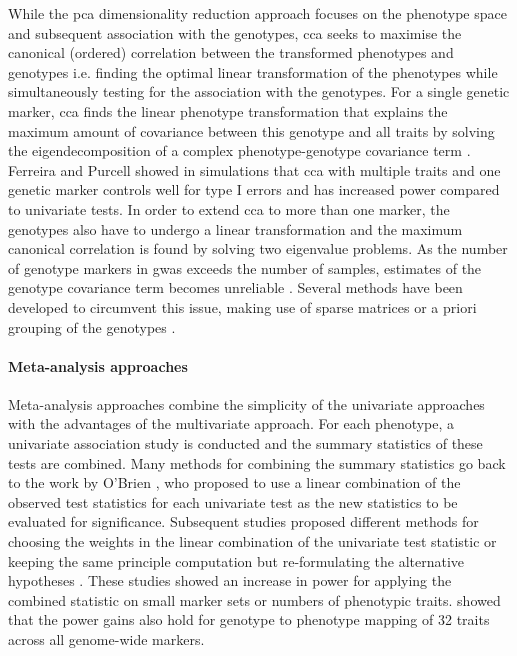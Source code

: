 While the \gls{pca}  dimensionality reduction approach focuses on the phenotype space and subsequent association with the genotypes, \gls{cca}   seeks to maximise the canonical (ordered) correlation between the transformed phenotypes and genotypes i.e. finding the optimal linear transformation of the phenotypes while simultaneously testing for the association with the genotypes.  For a single genetic marker, \gls{cca}  finds the linear phenotype transformation that explains the maximum amount of covariance between this genotype and all traits by solving the eigendecomposition of a complex phenotype-genotype covariance term \citep{Yang2012b}. Ferreira and Purcell \parencite*{Ferreira2009} showed in simulations that \gls{cca}  with multiple traits and one genetic marker controls well for type I errors and has increased power compared to univariate tests. In order to extend \gls{cca}  to more than one marker, the genotypes also have to undergo a linear transformation and the maximum canonical correlation is found by solving two eigenvalue problems. As the number of genotype markers in \gls{gwas}  exceeds the number of samples, estimates of the genotype covariance term becomes unreliable \citep{Schaefer2005}. Several methods have been developed to circumvent this issue, making use of sparse matrices \citep{Parkhomenko2009} or a priori grouping of the genotypes \citep{Naylor2010}. 

\paragraph{Meta-analysis approaches} Meta-analysis approaches combine the simplicity of the univariate approaches with the advantages of the multivariate approach. For each phenotype, a univariate association study is conducted and the summary statistics of these tests are combined. Many methods for combining the summary statistics \citep{Xu2003,Yang2010,Bolormaa2014} go back to the work by O'Brien \citep{OBrien1984}, who proposed to use a linear combination of the observed test statistics for each univariate test as the new statistics to be evaluated for significance. Subsequent studies proposed different methods for choosing the weights in the linear combination of the univariate test statistic or keeping the same principle computation but re-formulating the alternative hypotheses \citep{Yang2010,Xu2003}. These studies showed an increase in power for applying the combined statistic on small marker sets or numbers of phenotypic traits. \citet{Bolormaa2014} showed that the power gains also hold for genotype to phenotype mapping of 32 traits across all genome-wide markers. 

